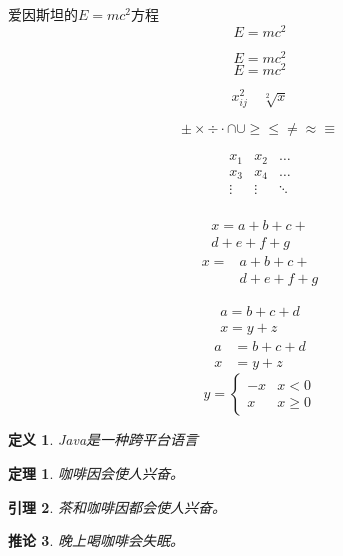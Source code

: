 \documentclass{article}
\begin{document}
 
	爱因斯坦的$E=mc^2$方程
	\begin{equation}
		E=mc^2
	\end{equation}

	\[E=mc^2\]
	\[\boxed{E=mc^2}\]

	\[x_{ij}^2\quad \sqrt[2]{x}\]

	\[\pm \times \div \cdot \cap \cup \geq \leq \neq \approx \equiv\]

	\[\begin{array}{ccc} 
	x_1 & x_2 & \dots \\ 
	x_3 & x_4 & \dots \\ 
	\vdots & \vdots & \ddots \\ 
	\end{array}\]

	\begin{multline}
		x=a+b+c+\\
		d+e+f+g
	\end{multline}
	\[\begin{split}
		x=&a+b+c+\\
		&d+e+f+g
	\end{split}\]

	\begin{gather}
		a=b+c+d\\
		x=y+z
	\end{gather}
	\begin{align}
		a&=b+c+d\\
		x&=y+z
	\end{align}
	\[y=\begin{cases}
	-x & x<0\\
	x & x\ge0
	\end{cases}\]

	\newtheorem{definition}{定义}[section]
	\newtheorem{theorem}{定理}[section]
	\newtheorem{lemma}[theorem]{引理}
	\newtheorem{corollary}[theorem]{推论}

	\begin{definition}
		Java是一种跨平台语言
	\end{definition}

	\begin{theorem}
		咖啡因会使人兴奋。
	\end{theorem}

	\begin{lemma}
		茶和咖啡因都会使人兴奋。
	\end{lemma}

	\begin{corollary}
		晚上喝咖啡会失眠。
	\end{corollary}
\end{document}
